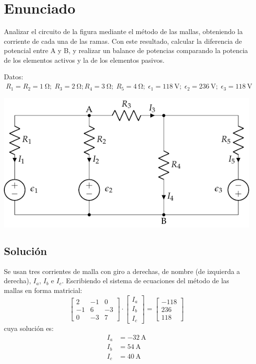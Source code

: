 \section{Enunciado}
Analizar el circuito de la figura mediante el método de las mallas,
obteniendo la corriente de cada una de las ramas. Con este resultado,
calcular la diferencia de potencial entre A y B, y realizar un balance
de potencias comparando la potencia de los elementos activos y la de
los elementos pasivos.

\vspace{2mm}
Datos:
$\; R_1 = R_2 = \qty{1}{\ohm};\; R_3 = \qty{2}{\ohm}; R_4 = \qty{3}{\ohm};\;
R_5=\qty{4}{\ohm};\; \epsilon_1=\qty{118}{\volt};\; \epsilon_2 =
\qty{236}{\volt};\; \epsilon_3 = \qty{118}{\volt}$

\begin{center}
  \includegraphics{figuras/mallas2.pdf}
\end{center}

\subsection*{Solución}
Se usan tres corrientes de malla con giro a derechas, de nombre (de
izquierda a derecha), $I_a$, $I_b$ e $I_c$. Escribiendo el sistema de
ecuaciones del método de las mallas en forma matricial:
\begin{equation*}
  \begin{bmatrix}
    2 & -1 & 0 \\
    -1 & 6 & -3 \\
    0 & -3 & 7
  \end{bmatrix}
  \cdot
  \begin{bmatrix}
    I_a\\
    I_b\\
    I_c
  \end{bmatrix}
  =
  \begin{bmatrix}
    -118\\
    236\\
    118
  \end{bmatrix}
\end{equation*}
cuya solución es:
\begin{align*}
  I_a &= \qty{-32}{\ampere}\\
  I_b &= \qty{54}{\ampere}\\
  I_c &= \qty{40}{\ampere}
\end{align*}

